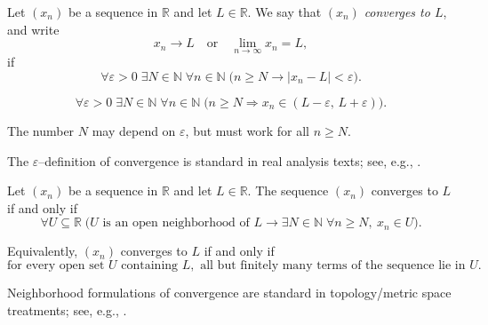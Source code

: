 \begin{tcolorbox}[colback=propbox, colframe=propborder, arc=2pt,
  left=6pt, right=6pt, top=4pt, bottom=4pt,
  title={\small\textbf{Definition (Convergence — $\varepsilon$ definition)}},
  fonttitle=\small\bfseries]
Let $(x_n)$ be a sequence in $\mathbb{R}$ and let $L\in\mathbb{R}$.
We say that $(x_n)$ \emph{converges to $L$}, and write
\[
x_n \to L
\quad\text{or}\quad
\lim_{n\to\infty} x_n = L,
\]
if
\[
\forall \varepsilon>0\;
\exists N\in\mathbb{N}\;
\forall n\in\mathbb{N}\;
\bigl(n\ge N \rightarrow |x_n - L| < \varepsilon\bigr).
\]
\end{tcolorbox}

\begin{remark}
\[
\forall \varepsilon>0\;
\exists N\in\mathbb{N}\;
\forall n\in\mathbb{N}\;
\bigl(
n\ge N \Rightarrow x_n \in (L-\varepsilon,\,L+\varepsilon)
\bigr).
\]
\end{remark}

\begin{remark}
The number $N$ may depend on $\varepsilon$, but must work for all $n\ge N$.
\end{remark}

\begin{remark}
The $\varepsilon$--definition of convergence is standard in real analysis texts;
see, e.g., \cite{AbbottUnderstandingAnalysis, TaoAnalysis1, RossElementaryAnalysis, Rudin1976, LeblBasicAnalysisI}.
\end{remark}

\begin{tcolorbox}[colback=propbox, colframe=propborder, arc=2pt,
  left=6pt, right=6pt, top=4pt, bottom=4pt,
  title={\small\textbf{Definition (Neighborhood formulation of convergence in $\mathbb{R}$)}},
  fonttitle=\small\bfseries]
Let $(x_n)$ be a sequence in $\mathbb{R}$ and let $L\in\mathbb{R}$.
The sequence $(x_n)$ converges to $L$ if and only if
\[
\forall U \subseteq \mathbb{R}\;
\bigl(
U \text{ is an open neighborhood of } L
\rightarrow
\exists N\in\mathbb{N}\;
\forall n\ge N,\ x_n\in U
\bigr).
\]
\end{tcolorbox}

\begin{remark}
Equivalently, $(x_n)$ converges to $L$ if and only if
\[
\text{for every open set } U \text{ containing } L,
\text{ all but finitely many terms of the sequence lie in } U.
\]
\end{remark}

\begin{remark}
Neighborhood formulations of convergence are standard in topology/metric space treatments;
see, e.g., \cite{MendelsonTopology, AnderssonBjornWimanMetricSpaces, Rudin1976}.
\end{remark}

